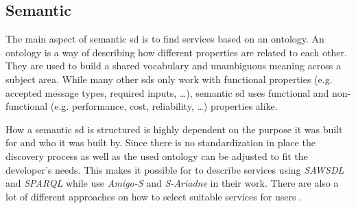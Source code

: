 \subsection{Semantic }\label{sec:semanticsd}

The main aspect of semantic \gls{sd} is to find services based on an ontology. An ontology is a way of describing how different properties are related to each other. They are used to build a shared vocabulary and unambiguous meaning across a subject area.
While many other \glspl{sd} only work with functional properties (e.g. accepted message types, required inputs, \dots), semantic \gls{sd} uses functional and non-functional (e.g. performance, cost, reliability, \dots) properties alike.

How a semantic \gls{sd} is structured is highly dependent on the purpose it was built for and who it was built by. Since there is no standardization in place the discovery process as well as the used ontology can be adjusted to fit the developer's needs. This makes it possible for \citeauthor{Iqbal.12320081252008.SSDuSaS} \autocite{Iqbal.12320081252008.SSDuSaS} to describe services using \emph{SAWSDL} and \emph{SPARQL} while \citeauthor{BenMokhtar.2006.ESSDiPCE} \autocite{BenMokhtar.2006.ESSDiPCE} use \emph{Amigo-S} and \emph{S-Ariadne} in their work. There are also a lot of different approaches on how to select suitable services for users \autocite{Majithia.2004.Rbssd} \autocite{Jia.2017} \autocite{Zhao.2017}.
